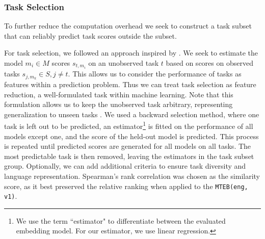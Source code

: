 \subsubsection{Task Selection}
\label{sec:taskselection}

To further reduce the computation overhead we seek to construct a task subset that can reliably predict task scores outside the subset.

For task selection, we followed an approach inspired by \citet{Xia2020PredictingPerformance}. We seek to estimate the model $m_i \in M$ scores $s_{t, m_i}$ on an unobserved task $t$ based on scores on observed tasks $s_{j, m_k} \in S, j \neq t$. This allows us to consider the performance of tasks as features within a prediction problem. Thus we can treat task selection as feature reduction, a well-formulated task within machine learning. Note that this formulation allows us to keep the unobserved task arbitrary, representing generalization to unseen tasks \citep{cholletMeasureIntelligence2019}. We used a backward selection method, where one task is left out to be predicted, an estimator\footnote{We use the term ``estimator" to differentiate between the evaluated embedding model. For our estimator, we use linear regression.}
is fitted on the performance of all models except one, and the score of the held-out model is predicted. This process is repeated until predicted scores are generated for all models on all tasks.
The most predictable task is then removed, leaving the estimators in the task subset group. Optionally, we can add additional criteria to ensure task diversity and language representation. Spearman's rank correlation was chosen as the similarity score, as it best preserved the relative ranking when applied to the \texttt{MTEB(eng, v1)}.


